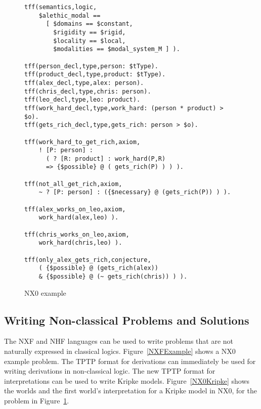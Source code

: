 \documentclass[runningheads]{llncs}
\begin{document}

\begin{figure}[htbp]
\small
{}
\begin{verbatim}
tff(semantics,logic,
    $alethic_modal ==
      [ $domains == $constant,
        $rigidity == $rigid,
        $locality == $local,
        $modalities == $modal_system_M ] ).

tff(person_decl,type,person: $tType).
tff(product_decl,type,product: $tType).
tff(alex_decl,type,alex: person).
tff(chris_decl,type,chris: person).
tff(leo_decl,type,leo: product).
tff(work_hard_decl,type,work_hard: (person * product) > $o).
tff(gets_rich_decl,type,gets_rich: person > $o).

tff(work_hard_to_get_rich,axiom,
    ! [P: person] :
      ( ? [R: product] : work_hard(P,R)
      => {$possible} @ ( gets_rich(P) ) ) ).

tff(not_all_get_rich,axiom,
    ~ ? [P: person] : ({$necessary} @ (gets_rich(P)) ) ).

tff(alex_works_on_leo,axiom,
    work_hard(alex,leo) ).

tff(chris_works_on_leo,axiom,
    work_hard(chris,leo) ).

tff(only_alex_gets_rich,conjecture,
    ( {$possible} @ (gets_rich(alex)) 
    & {$possible} @ (~ gets_rich(chris)) ) ).
\end{verbatim}
\caption{NX0 example}
\label{NX0Example}
\end{figure}

\subsection{Writing Non-classical Problems and Solutions}
\label{NTFProblemsSolutions}

The NXF and NHF languages can be used to write problems that are not naturally expressed in
classical logics.
Figure~\ref{NXFExample} shows a NX0 example problem.
The TPTP format for derivations \cite{SS+06} can immediately be used for writing derivations in
non-classical logic.
The new TPTP format for interpretations can be used to write Kripke models.
Figure~\ref{NX0Kripke} shows the worlds and the first world's interpretation for a Kripke
model in NX0, for the problem in Figure~\ref{NX0Example}.
\end{document}
